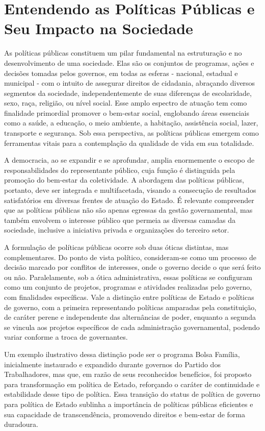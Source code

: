 \documentclass[
   article,       
   12pt,          
   oneside,       
   a4paper,       
   english,       
   brazil,        
   sumario=tradicional
   ]{abntex2}
\begin{document}
\section{Entendendo as Políticas Públicas e Seu Impacto na Sociedade}

As políticas públicas constituem um pilar fundamental na estruturação e no desenvolvimento de uma sociedade. Elas são os conjuntos de programas, ações e decisões tomadas pelos governos, em todas as esferas - nacional, estadual e municipal - com o intuito de assegurar direitos de cidadania, abraçando diversos segmentos da sociedade, independentemente de suas diferenças de escolaridade, sexo, raça, religião, ou nível social. Esse amplo espectro de atuação tem como finalidade primordial promover o bem-estar social, englobando áreas essenciais como a saúde, a educação, o meio ambiente, a habitação, assistência social, lazer, transporte e segurança. Sob essa perspectiva, as políticas públicas emergem como ferramentas vitais para a contemplação da qualidade de vida em sua totalidade.

A democracia, ao se expandir e se aprofundar, amplia enormemente o escopo de responsabilidades do representante público, cuja função é distinguida pela promoção do bem-estar da coletividade. A abordagem das políticas públicas, portanto, deve ser integrada e multifacetada, visando a consecução de resultados satisfatórios em diversas frentes de atuação do Estado. É relevante compreender que as políticas públicas não são apenas egressas da gestão governamental, mas também envolvem o interesse público que permeia as diversas camadas da sociedade, inclusive a iniciativa privada e organizações do terceiro setor.

A formulação de políticas públicas ocorre sob duas óticas distintas, mas complementares. Do ponto de vista político, consideram-se como um processo de decisão marcado por conflitos de interesses, onde o governo decide o que será feito ou não. Paralelamente, sob a ótica administrativa, essas políticas se configuram como um conjunto de projetos, programas e atividades realizadas pelo governo, com finalidades específicas. Vale a distinção entre políticas de Estado e políticas de governo, com a primeira representando políticas amparadas pela constituição, de caráter perene e independente das alternâncias de poder, enquanto a segunda se vincula aos projetos específicos de cada administração governamental, podendo variar conforme a troca de governantes.

Um exemplo ilustrativo dessa distinção pode ser o programa Bolsa Família, inicialmente instaurado e expandido durante governos do Partido dos Trabalhadores, mas que, em razão de seus reconhecidos benefícios, foi proposto para transformação em política de Estado, reforçando o caráter de continuidade e estabilidade desse tipo de política. Essa transição do status de política de governo para política de Estado sublinha a importância de políticas públicas eficientes e sua capacidade de transcendência, promovendo direitos e bem-estar de forma duradoura.
\end{document}
